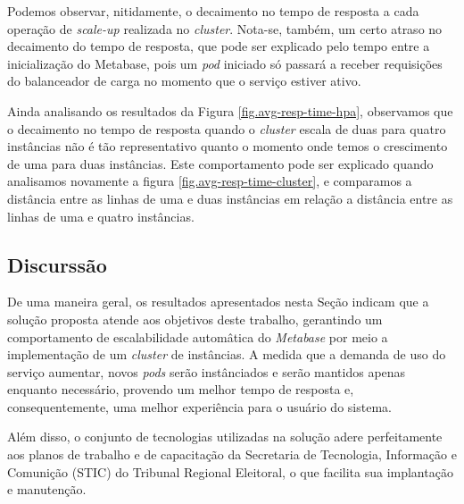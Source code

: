 Podemos observar, nitidamente, o decaimento no tempo de resposta a cada operação de \textit{scale-up} realizada no \textit{cluster}. Nota-se, também, um certo atraso no decaimento do tempo de resposta, que pode ser explicado pelo tempo entre a inicialização do Metabase, pois um \textit{pod} iniciado só passará a receber requisições do balanceador de carga no momento que o serviço estiver ativo.

Ainda analisando os resultados da Figura \ref{fig.avg-resp-time-hpa}, observamos que o decaimento no tempo de resposta quando o \textit{cluster} escala de duas para quatro instâncias não é tão representativo quanto o momento onde temos o crescimento de uma para duas instâncias. Este comportamento pode ser explicado quando analisamos novamente a figura \ref{fig.avg-resp-time-cluster}, e comparamos a distância entre as linhas de uma e duas instâncias em relação a distância entre as linhas de uma e quatro instâncias.


\subsection{Discurssão}

De uma maneira geral, os resultados apresentados nesta Seção indicam que a solução proposta atende aos objetivos deste trabalho, gerantindo um comportamento de escalabilidade automâtica do \textit{Metabase} por meio a implementação de um \textit{cluster} de instâncias. A medida que a demanda de uso do serviço aumentar, novos \textit{pods} serão instânciados e serão mantidos apenas enquanto necessário, provendo um melhor tempo de resposta e, consequentemente, uma melhor experiência para o usuário do sistema. 

Além disso, o conjunto de tecnologias utilizadas na solução adere perfeitamente aos planos de trabalho e de capacitação da Secretaria de Tecnologia, Informação e Comunição (STIC) do Tribunal Regional Eleitoral, o que facilita sua implantação e manutenção.


